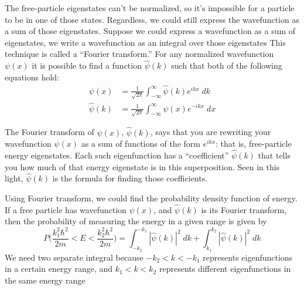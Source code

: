 \documentclass[../../../main.tex]{subfiles}
\begin{document}
The free-particle eigenstates can't be normalized, so it's impossible for a particle to be in one of those states. Regardless, we could still express the wavefunction as a sum of those eigenstates. Suppose we could express a wavefunction as a sum of eigenstates, we write a wavefunction as an integral over those eigenstates This technique is called a “Fourier transform.” For any normalized wavefunction ${\psi}(x)$ it is possible to find a function $\hat{\psi}(k)$ such that both of the following equations hold:
\begin{align*}
    \psi(x)&= \frac{1}{\sqrt{2\pi}} \int_{-\infty}^{\infty}\hat{\psi}(k) e^{ikx}\;dk\\
    \hat{\psi}(k)&= \frac{1}{\sqrt{2\pi}} \int_{-\infty}^{\infty}\psi(x) e^{-ikx}\;dx
\end{align*}

The Fourier transform of ${\psi}(x)$, $\hat{\psi}(k)$, says that you are rewriting your wavefunction ${\psi}(x)$ as a sum of functions of the form $e^{ikx}$: that is, free-particle energy eigenstates. Each such eigenfunction has a “coefficient” $\hat{\psi}(k)$ that tells you how much of that energy eigenstate is in this superposition. Seen in this light, $\hat{\psi}(k)$ is the formula for finding those coefficients.

Using Fourier transform, we could find the probability density function of energy. If a free particle has wavefunction ${\psi}(x)$, and $\hat{\psi}(k)$ is its Fourier transform, then the probability of measuring the energy in a given range is given by
\begin{equation*}
    P\biggl( \frac{k_1^2\hbar^2}{2m}<E< \frac{k_2^2\hbar^2}{2m}\biggr)=\int_{-k_2}^{-k_1}|\hat{\psi}(k)|^2\;dk+\int_{k_1}^{k_2}|\hat{\psi}(k)|^2\;dk
\end{equation*}
We need two separate integral because $-k_2 < k < - k_1$ represents eigenfunctions in a certain energy range, and $k_1 < k < k_2$ represents different eigenfunctions in the same energy range
\end{document}
